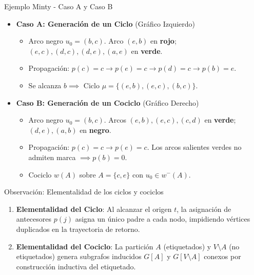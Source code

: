 \documentclass[
  ignorenonframetext,
]{beamer}
\providecommand{\tightlist}{%
  \setlength{\itemsep}{0pt}\setlength{\parskip}{0pt}}
\begin{document}
\begin{frame}{Ejemplo Minty - Caso A y Caso B}
\label{ejemplo-minty---caso-a-y-caso-b}
\begin{itemize}
\tightlist
\item
  \textbf{Caso A: Generación de un Ciclo} (Gráfico Izquierdo)

  \begin{itemize}
  \tightlist
  \item
    Arco negro \(u_0 = (b, c)\). Arco \((e, b)\) en \textbf{rojo};
    \((e, c), (d, c), (d, e), (a, e)\) en \textbf{verde}.
  \item
    Propagación: \(p(c)=c \to p(e)=c \to p(d)=c \to p(b)=e\).
  \item
    Se alcanza \(b \implies\) Ciclo
    \(\mu = \{(e, b), (e, c), (b, c)\}\).
  \end{itemize}
\item
  \textbf{Caso B: Generación de un Cociclo} (Gráfico Derecho)

  \begin{itemize}
  \tightlist
  \item
    Arco negro \(u_0 = (b, c)\). Arcos \((e, b), (e, c), (c, d)\) en
    \textbf{verde}; \((d, e), (a, b)\) en \textbf{negro}.
  \item
    Propagación: \(p(c)=c \to p(e)=c\). Los arcos salientes verdes no
    admiten marca \(\implies p(b)=0\).
  \item
    Cociclo \(w(A)\) sobre \(A = \{c, e\}\) con \(u_0 \in w^-(A)\).
  \end{itemize}
\end{itemize}
\end{frame}

\begin{frame}{Observación: Elementalidad de los ciclos y cociclos}
\label{observaciuxf3n-elementalidad-de-los-ciclos-y-cociclos}
\begin{tcolorbox}[enhanced jigsaw, opacityback=0, breakable, title=\textcolor{quarto-callout-note-color}{\faInfo}\hspace{0.5em}{Elementalidad de los ciclos y cociclos de Minty}, colback=white, colbacktitle=quarto-callout-note-color!10!white, bottomrule=.15mm, opacitybacktitle=0.6, coltitle=black, bottomtitle=1mm, leftrule=.75mm, colframe=quarto-callout-note-color-frame, toptitle=1mm, titlerule=0mm, rightrule=.15mm, left=2mm, arc=.35mm, toprule=.15mm]

\begin{enumerate}
\item
  \textbf{Elementalidad del Ciclo}: Al alcanzar el origen \(t\), la
  asignación de antecesores \(p(j)\) asigna un único padre a cada nodo,
  impidiendo vértices duplicados en la trayectoria de retorno.
\item
  \textbf{Elementalidad del Cociclo}: La partición \(A\) (etiquetados) y
  \(V \setminus A\) (no etiquetados) genera subgrafos inducidos \(G[A]\)
  y \(G[V \setminus A]\) conexos por construcción inductiva del
  etiquetado.
\end{enumerate}

\end{tcolorbox}
\end{frame}
\end{document}
